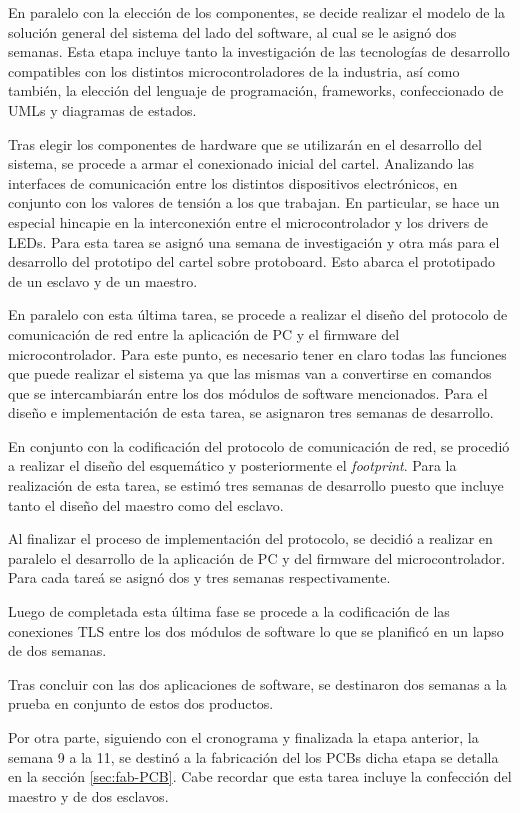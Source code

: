 En paralelo con la elección de los componentes, se decide realizar el modelo de la solución general del sistema del lado del software, al cual se le asignó dos semanas. Esta etapa incluye tanto la investigación de las tecnologías de desarrollo compatibles con los distintos microcontroladores de la industria, así como también, la elección del lenguaje de programación, frameworks, confeccionado de UMLs y diagramas de estados.

Tras elegir los componentes de hardware que se utilizarán en el desarrollo del sistema, se procede a armar el conexionado inicial del cartel. Analizando las interfaces de comunicación entre los distintos dispositivos electrónicos, en conjunto con los valores de tensión a los que trabajan.
En particular, se hace un especial hincapie en la interconexión entre el microcontrolador y los drivers de LEDs.
Para esta tarea se asignó una semana de investigación y otra más para el desarrollo del prototipo del cartel sobre protoboard. Esto abarca el prototipado de un esclavo y de un maestro.

En paralelo con esta última tarea, se procede a realizar el diseño del protocolo de comunicación de red entre la aplicación de PC y el firmware del microcontrolador. Para este punto, es necesario tener en claro todas las funciones que puede realizar el sistema ya que las mismas van a convertirse en comandos que se intercambiarán entre los dos módulos de software mencionados. Para el diseño e implementación de esta tarea, se asignaron tres semanas de desarrollo.

En conjunto con la codificación del protocolo de comunicación de red, se procedió a realizar el diseño del esquemático y posteriormente el \emph{footprint}. Para la realización de esta tarea, se estimó tres semanas de desarrollo puesto que incluye tanto el diseño del maestro como del esclavo.

Al finalizar el proceso de implementación del protocolo, se decidió a realizar en paralelo el desarrollo de la aplicación de PC y del firmware del microcontrolador. Para cada tareá se asignó dos y tres semanas respectivamente.

Luego de completada esta última fase se procede a la codificación de las conexiones TLS entre los dos módulos de software lo que se planificó en un lapso de dos semanas.

Tras concluir con las dos aplicaciones de software, se destinaron dos semanas a la prueba en conjunto de estos dos productos.

Por otra parte, siguiendo con el cronograma y finalizada la etapa anterior, la semana 9 a la 11, se destinó a la fabricación del los PCBs dicha etapa se detalla en la sección \ref{sec:fab-PCB}. Cabe recordar que esta tarea incluye la confección del maestro y de dos esclavos.

